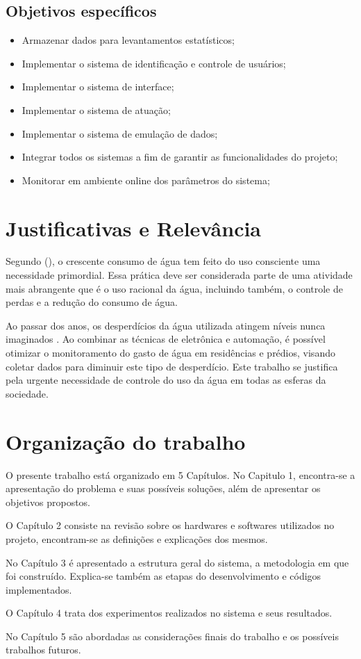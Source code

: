 \subsection{Objetivos específicos}

\begin{itemize}
	\item Armazenar dados para levantamentos estatísticos;
	\item Implementar o sistema de identificação e controle de usuários;
	\item Implementar o sistema de interface;
	\item Implementar o sistema de atuação;
	\item Implementar o sistema de emulação de dados;
	\item Integrar todos os sistemas a fim de garantir as funcionalidades do projeto;
	\item Monitorar em ambiente online dos parâmetros do sistema;
\end{itemize}

\section{Justificativas e Relev{\^a}ncia}
%
Segundo \citeauthor{AlvesDaSilva} (\citeyear{AlvesDaSilva}), o crescente consumo de água
tem feito do uso consciente uma necessidade primordial. Essa prática deve ser considerada parte de uma atividade mais abrangente que é o uso racional da água, incluindo também, o controle de perdas e a redução do consumo de água.

Ao passar dos anos, os desperdícios da água utilizada atingem níveis nunca imaginados \cite{rebouccas2003agua}. Ao combinar as técnicas de eletrônica e automação, é possível otimizar o monitoramento do gasto de água em residências e prédios, visando coletar dados para diminuir este tipo de desperdício. Este trabalho se justifica pela urgente necessidade de controle do uso da água em todas as esferas da sociedade. 
%
\section{Organização do trabalho}

O presente trabalho está organizado em 5 Capítulos. No Capitulo 1, encontra-se a apresentação do problema e suas possíveis soluções, além de apresentar os objetivos propostos.

O Capítulo 2 consiste na revisão sobre os hardwares e softwares utilizados no projeto, encontram-se as definições e explicações dos mesmos.

No Capítulo 3 é apresentado a estrutura geral do sistema, a metodologia em que foi construído. Explica-se também as etapas do desenvolvimento e códigos implementados.

O Capítulo 4 trata dos experimentos realizados no sistema e seus resultados.

No Capítulo 5 são abordadas as considerações finais do trabalho e os possíveis trabalhos futuros.